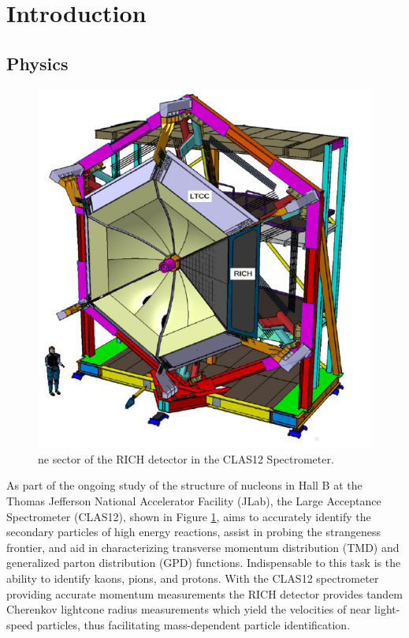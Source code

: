 \documentclass[prc,twocolumn]{revtex4}
\begin{document}
\date{\today}

\maketitle

\section{Introduction}

	\subsection{Physics}
	
		\begin{figure}
			\includegraphics[width=1.0\linewidth]{RICHclas12.png}
			\caption{ne sector of the RICH detector in the CLAS12 Spectrometer. \cite{CDR}}
			\label{CLAS12}
		\end{figure}
		
		As part of the ongoing study of the structure of nucleons in Hall B at the Thomas Jefferson National Accelerator Facility (JLab), the Large Acceptance Spectrometer (CLAS12), shown in Figure \ref{CLAS12}, aims to accurately identify the secondary particles of high energy reactions, assist in probing the strangeness frontier, and aid in characterizing transverse momentum distribution (TMD) and generalized parton distribution (GPD) functions. \cite{CDR}  Indispensable to this task is the ability to identify kaons, pions, and protons.  With the CLAS12 spectrometer providing accurate momentum measurements the RICH detector provides tandem Cherenkov lightcone radius measurements which yield the velocities of near light-speed particles, thus facilitating mass-dependent particle identification.
		
\end{document}
